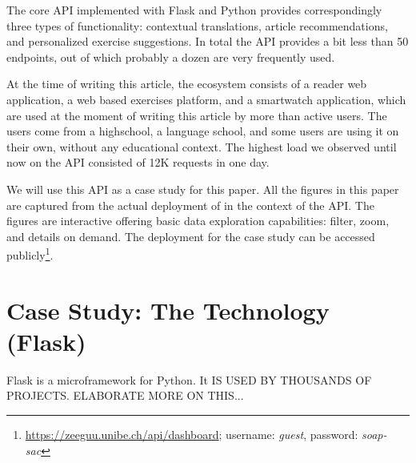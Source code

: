   The core API implemented with Flask and Python provides correspondingly three types of functionality: contextual translations, article recommendations, and personalized exercise suggestions. In total the API provides a bit less than 50 endpoints, out of which probably a dozen are very frequently used. 

  At the time of writing this article, the ecosystem consists of a reader web application, a web based exercises platform, and a smartwatch application, which are used at the moment of writing this article by more than \activeUserCount active users. The users come from a highschool, a language school, and some users are using it on their own, without any educational context. The highest load we observed until now on the API consisted of 12K requests in one day.


  
  We will use this \zee API as a case study for this paper. 
  All the figures in this paper are captured from the actual deployment of \tool in the context of the \zee API. The figures are interactive offering basic data exploration capabilities: filter, zoom, and details on demand\cite{Shne99a}. The \tool deployment for the case study can be accessed publicly\footnote{\url{https://zeeguu.unibe.ch/api/dashboard}; username: {\em guest}, password: {\em soap-sac}}. 


\newpage



\section{Case Study: The Technology (Flask)}
\label{sec:tool}

 Flask is a microframework for Python. It IS USED BY THOUSANDS OF PROJECTS. ELABORATE MORE ON THIS... 
 \vspace{2cm}

